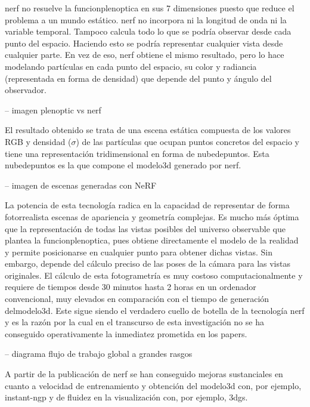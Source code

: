 \documentclass[a4paper, 12pt, spanish, twoside]{article}
\begin{document}
\acrshort{nerf} no resuelve la \gls{funcionplenoptica} en sus 7 dimensiones puesto que reduce el problema a un mundo estático. \acrshort{nerf} no incorpora ni la longitud de onda ni la variable temporal. Tampoco calcula todo lo que se podría observar desde cada punto del espacio. Haciendo esto se podría representar cualquier vista desde cualquier parte. En vez de eso, \acrshort{nerf} obtiene el mismo resultado, pero lo hace modelando partículas en cada punto del espacio, su color y radiancia (representada en forma de densidad) que depende del punto y ángulo del observador. 

-- imagen plenoptic vs nerf 

El resultado obtenido se trata de una escena estática compuesta de los valores RGB y densidad ($\sigma$) de las partículas que ocupan puntos concretos del espacio y tiene una representación tridimensional en forma de \gls{nubedepuntos}. Esta \gls{nubedepuntos} es la que compone el \gls{modelo3d} generado por \acrshort{nerf}. 

-- imagen de escenas generadas con NeRF 

La potencia de esta tecnología radica en la capacidad de representar de forma fotorrealista escenas de apariencia y geometría complejas. Es mucho más óptima que la representación de todas las vistas posibles del universo observable que plantea la \gls{funcionplenoptica}, pues obtiene directamente el modelo de la realidad y permite posicionarse en cualquier punto para obtener dichas vistas. Sin embargo, depende del cálculo preciso de las poses de la cámara para las vistas originales. El cálculo de esta fotogrametría es muy costoso computacionalmente y requiere de tiempos desde 30 minutos hasta 2 horas en un ordenador convencional, muy elevados en comparación con el tiempo de generación del\gls{modelo3d}. Este sigue siendo el verdadero cuello de botella de la tecnología \acrshort{nerf} y es la razón por la cual en el transcurso de esta investigación no se ha conseguido operativamente la inmediatez prometida en los papers. 

-- diagrama flujo de trabajo global a grandes rasgos 

A partir de la publicación de \acrshort{nerf} se han conseguido mejoras sustanciales en cuanto a velocidad de entrenamiento y obtención del \gls{modelo3d} con, por ejemplo, \gls{instant-ngp} y de fluidez en la visualización con, por ejemplo, \acrshort{3dgs}. 
\end{document}
